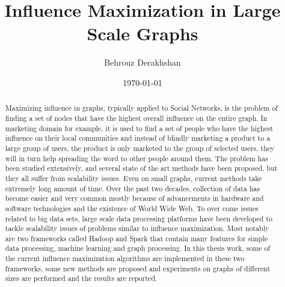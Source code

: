 \documentclass[english]{tktltiki}
\begin{document}
\onehalfspacing

\title{Influence Maximization in Large Scale Graphs}
\author{Behrouz Derakhshan}
\date{\today}

\maketitle



\begin{abstract}

Maximizing influence in graphs, typically applied to Social Networks, is the problem of finding a set of nodes that have the highest overall influence on the entire graph. In marketing domain for example, it is used to find a set of people who have the highest influence on their local communities and instead of blindly marketing a product to a large group of users, the product is only marketed to the group of selected users, they will in turn help spreading the word to other people around them. The problem has been studied extensively, and several state of the art methods have been proposed, but they all suffer from scalability issues. Even on small graphs, current methods take extremely long amount of time. Over the past two decades, collection of data has become easier and very common mostly because of advancements in hardware and software technologies and the existence of World Wide Web. To over come issues related to big data sets, large scale data processing platforms have been developed to tackle scalability issues of problems similar to influence maximization. Most notably are two frameworks called Hadoop and Spark that contain many features for simple data processing, machine learning and graph processing. In this thesis work, some of the current influence maximization algorithms are implemented in these two frameworks, some new methods are proposed and experiments on graphs of different sizes are performed and the results are reported. 

\end{abstract}
\end{document}
